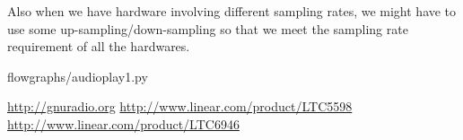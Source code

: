\documentclass[a4paper,10pt]{report}
\begin{document}
Also when we have hardware involving different sampling rates, we might have to use some up-sampling/down-sampling
so that we meet the sampling rate requirement of all the hardwares.



\begin{appendices}

{flowgraphs/audioplay1.py}
\end{appendices}

% 
% 


\begin{thebibliography}{9}
 \url{http://gnuradio.org}
 \url{http://www.linear.com/product/LTC5598} 
 \url{http://www.linear.com/product/LTC6946} 
 
 \end{thebibliography}
\end{document}
